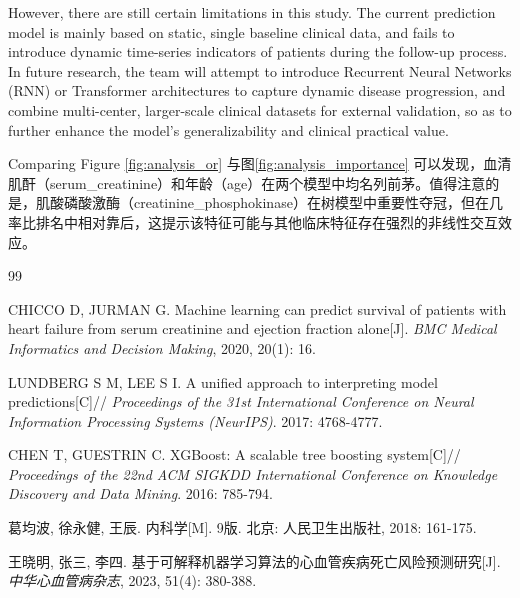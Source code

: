 \documentclass[11pt,a4paper]{article}
\begin{document}
However, there are still certain limitations in this study. The current prediction model is mainly based on static, single baseline clinical data, and fails to introduce dynamic time-series indicators of patients during the follow-up process. In future research, the team will attempt to introduce Recurrent Neural Networks (RNN) or Transformer architectures to capture dynamic disease progression, and combine multi-center, larger-scale clinical datasets for external validation, so as to further enhance the model's generalizability and clinical practical value.

Comparing Figure \ref{fig:analysis_or} 与图\ref{fig:analysis_importance} 可以发现，血清肌酐（serum\_creatinine）和年龄（age）在两个模型中均名列前茅。值得注意的是，肌酸磷酸激酶（creatinine\_phosphokinase）在树模型中重要性夺冠，但在几率比排名中相对靠后，这提示该特征可能与其他临床特征存在强烈的非线性交互效应。




\begin{thebibliography}{99}

CHICCO D, JURMAN G. 
Machine learning can predict survival of patients with heart failure from serum creatinine and ejection fraction alone[J]. 
\textit{BMC Medical Informatics and Decision Making}, 2020, 20(1): 16.

LUNDBERG S M, LEE S I. 
A unified approach to interpreting model predictions[C]//
\textit{Proceedings of the 31st International Conference on Neural Information Processing Systems (NeurIPS)}. 
2017: 4768-4777.

CHEN T, GUESTRIN C. 
XGBoost: A scalable tree boosting system[C]//
\textit{Proceedings of the 22nd ACM SIGKDD International Conference on Knowledge Discovery and Data Mining}. 
2016: 785-794.

葛均波, 徐永健, 王辰. 
内科学[M]. 9版. 
北京: 人民卫生出版社, 2018: 161-175.

王晓明, 张三, 李四. 
基于可解释机器学习算法的心血管疾病死亡风险预测研究[J]. 
\textit{中华心血管病杂志}, 2023, 51(4): 380-388.

\end{thebibliography}
\end{document}
